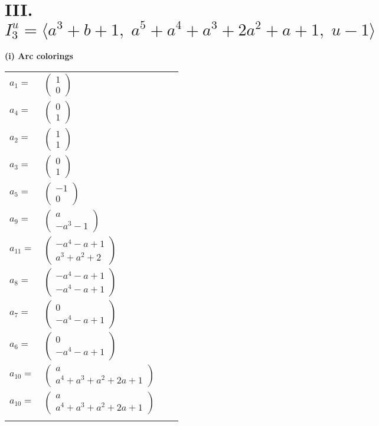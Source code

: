 \documentclass[1p]{elsarticle_modified}
\theoremstyle{definition}
\begin{document}
\centering \section*{III. $I^u_{3}= \langle a^3+b+1,\;a^5+a^4+a^3+2 a^2+a+1,\;u-1 \rangle$}
\flushleft \textbf{(i) Arc colorings}\\
\begin{tabular}{m{7pt} m{180pt} m{7pt} m{180pt} }
\flushright $a_{1}=$&$\begin{pmatrix}1\\0\end{pmatrix}$ \\
\flushright $a_{4}=$&$\begin{pmatrix}0\\1\end{pmatrix}$ \\
\flushright $a_{2}=$&$\begin{pmatrix}1\\1\end{pmatrix}$ \\
\flushright $a_{3}=$&$\begin{pmatrix}0\\1\end{pmatrix}$ \\
\flushright $a_{5}=$&$\begin{pmatrix}-1\\0\end{pmatrix}$ \\
\flushright $a_{9}=$&$\begin{pmatrix}a\\- a^3-1\end{pmatrix}$ \\
\flushright $a_{11}=$&$\begin{pmatrix}- a^4- a+1\\a^3+a^2+2\end{pmatrix}$ \\
\flushright $a_{8}=$&$\begin{pmatrix}- a^4- a+1\\- a^4- a+1\end{pmatrix}$ \\
\flushright $a_{7}=$&$\begin{pmatrix}0\\- a^4- a+1\end{pmatrix}$ \\
\flushright $a_{6}=$&$\begin{pmatrix}0\\- a^4- a+1\end{pmatrix}$ \\
\flushright $a_{10}=$&$\begin{pmatrix}a\\a^4+a^3+a^2+2 a+1\end{pmatrix}$\\ \flushright $a_{10}=$&$\begin{pmatrix}a\\a^4+a^3+a^2+2 a+1\end{pmatrix}$\\&\end{tabular}
\end{document}
